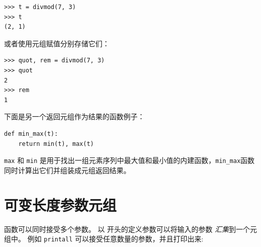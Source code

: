 \begin{lstlisting}
>>> t = divmod(7, 3)
>>> t
(2, 1)
\end{lstlisting}

%

或者使用元组赋值分别存储它们：

  

\begin{lstlisting}
>>> quot, rem = divmod(7, 3)
>>> quot
2
>>> rem
1
\end{lstlisting}

%

下面是另一个返回元组作为结果的函数例子：

\begin{lstlisting}
def min_max(t):
    return min(t), max(t)
\end{lstlisting}

%

\lstinline{max} 和 \lstinline{min} 是用于找出一组元素序列中最大值和最小值的内建函数，\lstinline{min_max}函数同时计算出它们并组装成元组返回结果。
 
 


\section{可变长度参数元组}
\label{gather}
 
  


函数可以同时接受多个参数。 以 {\bf *} 开头的定义参数可以将输入的参数 \emph{汇集}到一个元组中。 例如 \lstinline{printall} 可以接受任意数量的参数，并且打印出来:

